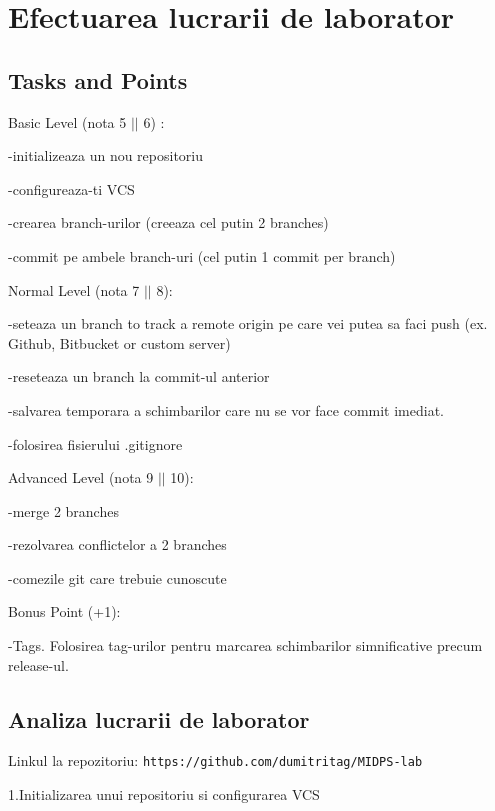 
\section{Efectuarea lucrarii de laborator}



\subsection{Tasks and Points}



Basic Level (nota 5 $||$ 6) : 

-initializeaza un nou repositoriu

-configureaza-ti VCS

-crearea branch-urilor (creeaza cel putin 2 branches)

-commit pe ambele branch-uri (cel putin 1 commit per branch)



Normal Level (nota 7 $||$ 8):
 
-seteaza un branch to track a remote origin pe care vei putea sa faci push (ex. Github, Bitbucket or custom server)

-reseteaza un branch la commit-ul anterior

-salvarea temporara a schimbarilor care nu se vor face commit imediat.

-folosirea fisierului .gitignore



Advanced Level (nota 9 $||$ 10):

-merge 2 branches

-rezolvarea conflictelor a 2 branches

-comezile git care trebuie cunoscute 

Bonus Point (+1):

-Tags. Folosirea tag-urilor pentru marcarea schimbarilor simnificative precum release-ul.



\subsection{Analiza lucrarii de laborator}


Linkul la repozitoriu: \texttt{https://github.com/dumitritag/MIDPS-lab}

1.Initializarea unui repositoriu si configurarea VCS


